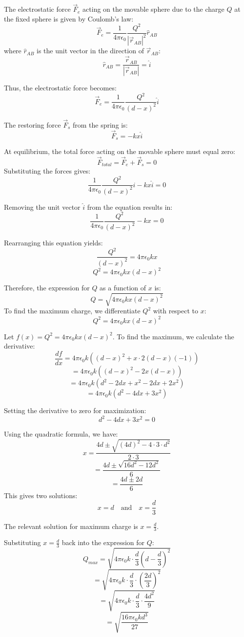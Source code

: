\documentclass[a4paper,12pt]{article}
\begin{document}
The electrostatic force \( \vec{F}_e \) acting on the movable sphere due to the charge \( Q \) at the fixed sphere is given by Coulomb's law:
\[
\vec{F}_e = \frac{1}{4\pi\epsilon_0} \frac{Q^2}{|\vec{r}_{AB}|^2} \hat{r}_{AB}
\]
where \( \hat{r}_{AB} \) is the unit vector in the direction of \( \vec{r}_{AB} \):
\[
\hat{r}_{AB} = \frac{\vec{r}_{AB}}{|\vec{r}_{AB}|} = \hat{i}
\]

Thus, the electrostatic force becomes:
\[
\vec{F}_e = \frac{1}{4\pi\epsilon_0} \frac{Q^2}{(d - x)^2} \hat{i}
\]

The restoring force \( \vec{F}_s \) from the spring is:
\[
\vec{F}_s = -k x \hat{i}
\]

At equilibrium, the total force acting on the movable sphere must equal zero:
\[
\vec{F}_{total} = \vec{F}_e + \vec{F}_s = 0
\]
Substituting the forces gives:
\[
\frac{1}{4\pi\epsilon_0} \frac{Q^2}{(d - x)^2} \hat{i} - k x \hat{i} = 0
\]

Removing the unit vector \( \hat{i} \) from the equation results in:
\[
\frac{1}{4\pi\epsilon_0} \frac{Q^2}{(d - x)^2} - k x = 0
\]

Rearranging this equation yields:
\[
\frac{Q^2}{(d - x)^2} = 4\pi\epsilon_0 k x
\]
\[
Q^2 = 4\pi\epsilon_0 k x (d - x)^2
\]

Therefore, the expression for \( Q \) as a function of \( x \) is:
\[
Q = \sqrt{4\pi\epsilon_0 k x (d - x)^2}
\]
To find the maximum charge, we differentiate \( Q^2 \) with respect to \( x \):
\[
Q^2 = 4\pi\epsilon_0 k x (d - x)^2
\]

Let \( f(x) = Q^2 = 4\pi\epsilon_0 k x (d - x)^2 \). To find the maximum, we calculate the derivative:
\[
\frac{df}{dx} = 4\pi\epsilon_0 k \left( (d - x)^2 + x \cdot 2(d - x)(-1) \right)
\]
\[
= 4\pi\epsilon_0 k \left( (d - x)^2 - 2x(d - x) \right)
\]
\[
= 4\pi\epsilon_0 k \left( d^2 - 2dx + x^2 - 2dx + 2x^2 \right)
\]
\[
= 4\pi\epsilon_0 k \left( d^2 - 4dx + 3x^2 \right)
\]

Setting the derivative to zero for maximization:
\[
d^2 - 4dx + 3x^2 = 0
\]

Using the quadratic formula, we have:
\[
x = \frac{4d \pm \sqrt{(4d)^2 - 4 \cdot 3 \cdot d^2}}{2 \cdot 3}
\]
\[
= \frac{4d \pm \sqrt{16d^2 - 12d^2}}{6}
\]
\[
= \frac{4d \pm 2d}{6}
\]
This gives two solutions:
\[
x = d \quad \text{and} \quad x = \frac{d}{3}
\]

The relevant solution for maximum charge is \( x = \frac{d}{3} \).

Substituting \( x = \frac{d}{3} \) back into the expression for \( Q \):
\[
Q_{max} = \sqrt{4\pi\epsilon_0 k \cdot \frac{d}{3} \left(d - \frac{d}{3}\right)^2}
\]
\[
= \sqrt{4\pi\epsilon_0 k \cdot \frac{d}{3} \cdot \left(\frac{2d}{3}\right)^2}
\]
\[
= \sqrt{4\pi\epsilon_0 k \cdot \frac{d}{3} \cdot \frac{4d^2}{9}}
\]
\[
= \boxed{\sqrt{\frac{16\pi\epsilon_0 k d^3}{27}}}
\]
\end{document}

